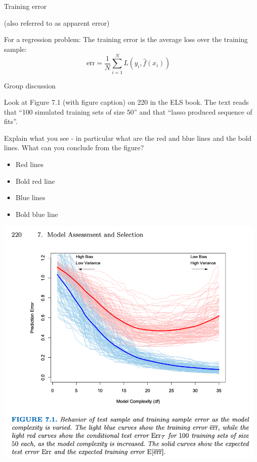 \documentclass[
  ignorenonframetext,
]{beamer}
\providecommand{\tightlist}{%
  \setlength{\itemsep}{0pt}\setlength{\parskip}{0pt}}
\begin{document}
\begin{frame}

\begin{block}{Training error}

(also referred to as apparent error)

For a regression problem: The training error is the average loss over
the training sample:
\[\overline{\text{err}}=\frac{1}{N} \sum_{i=1}^N L(y_i,\hat{f}(x_i))\]

\end{block}

\end{frame}

\begin{frame}

\begin{block}{Group discussion}

Look at Figure 7.1 (with figure caption) on 220 in the ELS book. The
text reads that ``100 simulated training sets of size 50'' and that
``lasso produced sequence of fits''.

Explain what you see - in particular what are the red and blue lines and
the bold lines. What can you conclude from the figure?

\begin{itemize}
\tightlist
\item
  Red lines
\item
  Bold red line
\item
  Blue lines
\item
  Bold blue line
\end{itemize}

\end{block}

\end{frame}

\begin{frame}

\includegraphics{ELSfig71.png}

\end{frame}
\end{document}
